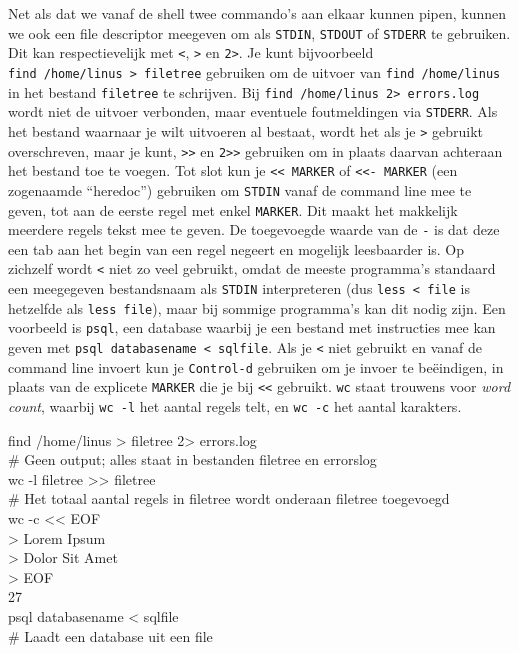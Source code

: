 Net als dat we vanaf de shell twee commando's aan elkaar kunnen pipen, kunnen we ook een file descriptor meegeven om als \texttt{STDIN}, \texttt{STDOUT} of \texttt{STDERR} te gebruiken. Dit kan respectievelijk met \texttt{\textless{}}, \texttt{\textgreater{}} en \texttt{2\textgreater{}}. Je kunt bijvoorbeeld \texttt{find\ /home/linus\ \textgreater{}\ filetree} gebruiken om de uitvoer van \texttt{find\ /home/linus} in het bestand \texttt{filetree} te schrijven. Bij \texttt{find\ /home/linus\ 2\textgreater{}\ errors.log} wordt niet de uitvoer verbonden, maar eventuele foutmeldingen via \texttt{STDERR}. Als het bestand waarnaar je wilt uitvoeren al bestaat, wordt het als je \texttt{\textgreater{}} gebruikt overschreven, maar je kunt, \texttt{\textgreater{}\textgreater{}} en \texttt{2\textgreater{}\textgreater{}} gebruiken om in plaats daarvan achteraan het bestand toe te voegen. Tot slot kun je \texttt{\textless{}\textless{}\ MARKER} of \texttt{\textless{}\textless{}-\ MARKER} (een zogenaamde ``heredoc'') gebruiken om \texttt{STDIN} vanaf de command line mee te geven, tot aan de eerste regel met enkel \texttt{MARKER}. Dit maakt het makkelijk meerdere regels tekst mee te geven. De toegevoegde waarde van de \texttt{-} is dat deze een tab aan het begin van een regel negeert en mogelijk leesbaarder is. Op zichzelf wordt \texttt{\textless{}} niet zo veel gebruikt, omdat de meeste programma's standaard een meegegeven bestandsnaam als \texttt{STDIN} interpreteren (dus \texttt{less\ \textless{}\ file} is hetzelfde als \texttt{less\ file}), maar bij sommige programma's kan dit nodig zijn. Een voorbeeld is \texttt{psql}, een database waarbij je een bestand met instructies mee kan geven met \texttt{psql\ databasename\ \textless{}\ sqlfile}. Als je \texttt{\textless{}} niet gebruikt en vanaf de command line invoert kun je \texttt{Control-d} gebruiken om je invoer te beëindigen, in plaats van de explicete \texttt{MARKER} die je bij \texttt{\textless{}\textless{}} gebruikt. \texttt{wc} staat trouwens voor \emph{word count}, waarbij \texttt{wc\ -l} het aantal regels telt, en \texttt{wc\ -c} het aantal karakters.

\begin{bash}
\userprompt[~] find /home/linus > filetree 2> errors.log\\
\# Geen output; alles staat in bestanden filetree en errorslog\\

\userprompt[~] wc -l filetree >\!> filetree\\
\# Het totaal aantal regels in filetree wordt onderaan filetree toegevoegd\\

\userprompt[~] wc -c <\!< EOF\\
> Lorem Ipsum\\
> Dolor Sit Amet\\
> EOF\\
27\\

\userprompt[~] psql databasename < sqlfile\\
\# Laadt een database uit een file\\
\end{bash}

